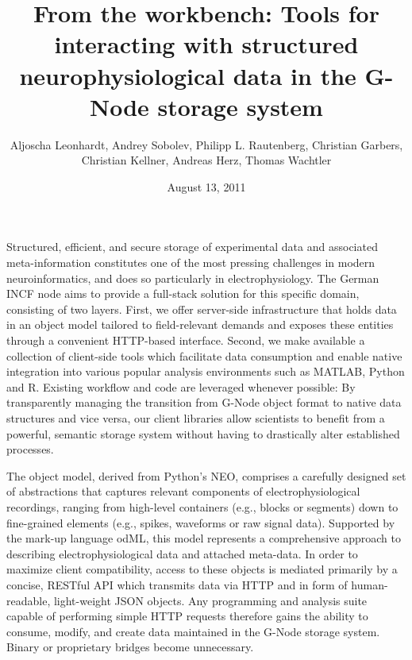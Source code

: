 \documentclass[a4paper]{article}
\begin{document}
\title{From the workbench: Tools for interacting with structured
  neurophysiological data in the G-Node storage system}

\author{

  Aljoscha Leonhardt,
  Andrey Sobolev,
  Philipp L. Rautenberg,
  Christian Garbers,
  Christian Kellner,
  Andreas Herz,
  Thomas Wachtler

}
\date{August 13, 2011}

\maketitle


Structured, efficient, and secure storage of experimental data and associated meta-information constitutes one of the most pressing challenges in modern neuroinformatics, and does so particularly in electrophysiology. The German INCF node aims to provide a full-stack solution for this specific domain, consisting of two layers. First, we offer server-side infrastructure that holds data in an object model tailored to field-relevant demands and exposes these entities through a convenient HTTP-based interface. Second, we make available a collection of client-side tools which facilitate data consumption and enable native integration into various popular analysis environments such as MATLAB, Python and R. Existing workflow and code are leveraged whenever possible: By transparently managing the transition from G-Node object format to native data structures and vice versa, our client libraries allow scientists to benefit from a powerful, semantic storage system without having to drastically alter established processes.

The object model, derived from Python's NEO, comprises a carefully designed set of abstractions that captures relevant components of electrophysiological recordings, ranging from high-level containers (e.g., blocks or segments) down to fine-grained elements (e.g., spikes, waveforms or raw signal data). Supported by the mark-up language odML, this model represents a comprehensive approach to describing electrophysiological data and attached meta-data. In order to maximize client compatibility, access to these objects is mediated primarily by a concise, RESTful API which transmits data via HTTP and in form of human-readable, light-weight JSON objects. Any programming and analysis suite capable of performing simple HTTP requests therefore gains the ability to consume, modify, and create data maintained in the G-Node storage system. Binary or proprietary bridges become unnecessary.
\end{document}
